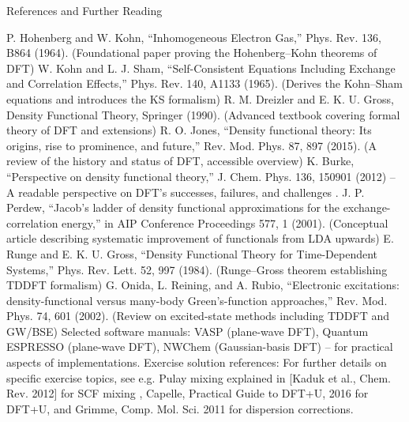 \begin{frame}{References and Further Reading}

P. Hohenberg and W. Kohn, “Inhomogeneous Electron Gas,” Phys. Rev. 136, B864 (1964). (Foundational paper proving the Hohenberg–Kohn theorems of DFT)
W. Kohn and L. J. Sham, “Self-Consistent Equations Including Exchange and Correlation Effects,” Phys. Rev. 140, A1133 (1965). (Derives the Kohn–Sham equations and introduces the KS formalism)
R. M. Dreizler and E. K. U. Gross, Density Functional Theory, Springer (1990). (Advanced textbook covering formal theory of DFT and extensions)
R. O. Jones, “Density functional theory: Its origins, rise to prominence, and future,” Rev. Mod. Phys. 87, 897 (2015). (A review of the history and status of DFT, accessible overview)
K. Burke, “Perspective on density functional theory,” J. Chem. Phys. 136, 150901 (2012) – A readable perspective on DFT’s successes, failures, and challenges  .
J. P. Perdew, “Jacob’s ladder of density functional approximations for the exchange-correlation energy,” in AIP Conference Proceedings 577, 1 (2001). (Conceptual article describing systematic improvement of functionals from LDA upwards)
E. Runge and E. K. U. Gross, “Density Functional Theory for Time-Dependent Systems,” Phys. Rev. Lett. 52, 997 (1984). (Runge–Gross theorem establishing TDDFT formalism)
G. Onida, L. Reining, and A. Rubio, “Electronic excitations: density-functional versus many-body Green’s-function approaches,” Rev. Mod. Phys. 74, 601 (2002). (Review on excited-state methods including TDDFT and GW/BSE)
Selected software manuals: VASP (plane-wave DFT), Quantum ESPRESSO (plane-wave DFT), NWChem (Gaussian-basis DFT) – for practical aspects of implementations.
Exercise solution references: For further details on specific exercise topics, see e.g. {Pulay mixing explained in [Kaduk et al., Chem. Rev. 2012]} for SCF mixing , {Capelle, Practical Guide to DFT+U, 2016} for DFT+U, and {Grimme, Comp. Mol. Sci. 2011} for dispersion corrections. \end{frame}

